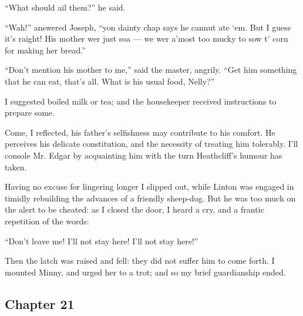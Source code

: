 \par “What should ail them?” he said.
\par “Wah!” answered Joseph, “yon dainty chap says he cannut ate ‘em. But I guess it's raight! His mother wer just soa — we wer a'most too mucky to sow t' corn for making her bread.”
\par “Don't mention his mother to me,” said the master, angrily. “Get him something that he can eat, that's all. What is his usual food, Nelly?”
\par I suggested boiled milk or tea; and the housekeeper received instructions to prepare some.
\par Come, I reflected, his father's selfishness may contribute to his comfort. He perceives his delicate constitution, and the necessity of treating him tolerably. I'll console Mr. Edgar by acquainting him with the turn Heathcliff's humour has taken.
\par Having no excuse for lingering longer I slipped out, while Linton was engaged in timidly rebuilding the advances of a friendly sheep-dog. But he was too much on the alert to be cheated: as I closed the door, I heard a cry, and a frantic repetition of the words:
\par “Don't leave me! I'll not stay here! I'll not stay here!”
\par Then the latch was raised and fell: they did not suffer him to come forth. I mounted Minny, and urged her to a trot; and so my brief guardianship ended.
















\subsection*{Chapter 21}

